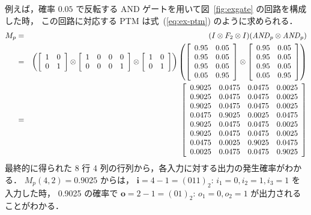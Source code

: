 例えば，確率 $0.05$ で反転する AND ゲートを用いて図~\ref{fig:exgate} の回路を構成した時，
この回路に対応する PTM は式~(\ref{eq:ex-ptm}) のように求められる．
\begin{eqnarray}
  M_p &=& (I \otimes F_2 \otimes I)({\it AND}_p \otimes {\it AND}_p) \label{eq:ex-ptm} \\
    &=& \left(
    \left[
    \begin{array}{cccc}
      1 & 0\\
      0 & 1\\
    \end{array}
    \right]
    \otimes
    \left[
    \begin{array}{cccc}
      1 & 0 & 0 & 0\\
      0 & 0 & 0 & 1
    \end{array}
    \right]
    \otimes
    \left[
    \begin{array}{cccc}
      1 & 0\\
      0 & 1\\
    \end{array}
    \right]
    \right)
    \left(
    \left[
    \begin{array}{cc}
      0.95 & 0.05\\
      0.95 & 0.05\\
      0.95 & 0.05\\
      0.05 & 0.95
    \end{array}
    \right]
    \otimes
    \left[
    \begin{array}{cc}
      0.95 & 0.05\\
      0.95 & 0.05\\
      0.95 & 0.05\\
      0.05 & 0.95
    \end{array}
    \right]
    \right) \nonumber \\
  &=& \left[\begin{array}{cccc}
    0.9025 & 0.0475 & 0.0475 & 0.0025\\
    0.9025 & 0.0475 & 0.0475 & 0.0025\\
    0.9025 & 0.0475 & 0.0475 & 0.0025\\
    0.0475 & 0.9025 & 0.0025 & 0.0475\\
    0.9025 & 0.0475 & 0.0475 & 0.0025\\
    0.9025 & 0.0475 & 0.0475 & 0.0025\\
    0.0475 & 0.0025 & 0.9025 & 0.0475\\
    0.0025 & 0.0475 & 0.0475 & 0.9025
  \end{array} \right] \nonumber
\end{eqnarray}
最終的に得られた 8 行 4 列の行列から，各入力に対する出力の発生確率がわかる．
 $M_p(4, 2) = 0.9025$ からは，
$\bm i = 4 - 1 = (011)_2$: $i_1 = 0, i_2 = 1, i_3 = 1$ を入力した時，
0.9025 の確率で $\bm o = 2 - 1 = (01)_2$: $o_1 = 0, o_2 = 1$ が出力されることがわかる．

